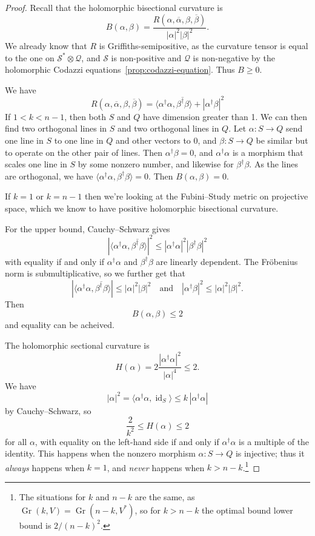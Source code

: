 \documentclass[11pt]{article}
\newtheorem*{proof}{Proof}
\newcommand{\cc}[1]{\mathcal{#1}}
\def\qandq{\quad\text{and}\quad}
\def\ov#1{\overline{#1}}
\DeclareMathOperator{\Gr}{Gr}
\DeclareMathOperator{\id}{id}
\begin{document}
\begin{proof}
Recall that the holomorphic bisectional curvature is
\[
B(\alpha,\beta)
= \frac{R(\alpha,\ov\alpha,\beta,\ov\beta)}{|\alpha|^2|\beta|^2}.
\]
We already know that $R$ is Griffiths-semipositive, as the curvature tensor is equal to the one on $\cc S^* \otimes \cc Q$, and $\cc S$ is non-positive and $\cc Q$ is non-negative by the holomorphic Codazzi equations~\ref{prop:codazzi-equation}. Thus $B \geq 0$.

We have
\[
R(\alpha,\ov\alpha,\beta,\ov\beta)
= \langle \alpha^\dagger \alpha, \ov{\beta^\dagger \beta} \rangle
+ |\alpha^\dagger \beta|^2
\]
If $1 < k < n-1$, then both $S$ and $Q$ have dimension greater than 1.
We can then find two orthogonal lines in $S$ and two orthogonal lines
in $Q$. Let $\alpha : S \to Q$ send one line in $S$ to one line in $Q$
and other vectors to 0, and $\beta : S \to Q$ be similar but to
operate on the other pair of lines.
Then $\alpha^\dagger \beta = 0$, and $\alpha^\dagger \alpha$ is a morphism that scales one line in $S$ by some nonzero number, and likewise for $\beta^\dagger \beta$. As the lines are orthogonal, we have $\langle \alpha^\dagger \alpha, \beta^\dagger \beta \rangle = 0$. Then $B(\alpha,\beta) = 0$.

If $k = 1$ or $k = n-1$ then we're looking at the Fubini--Study metric on projective space, which we know to have positive holomorphic bisectional curvature.

For the upper bound,
Cauchy--Schwarz gives
\[
|\langle \alpha^\dagger \alpha, \ov{\beta^\dagger \beta} \rangle|^2
\leq
|\alpha^\dagger \alpha|^2 |\beta^\dagger \beta|^2
\]
with equality if and only if $\alpha^\dagger\alpha$ and $\beta^\dagger\beta$ are linearly dependent.
The Fr\"obenius norm is submultiplicative, so we further get that
\[
|\langle \alpha^\dagger \alpha, \ov{\beta^\dagger \beta} \rangle|
\leq |\alpha|^2 |\beta|^2
\qandq
|\alpha^\dagger \beta|^2
\leq |\alpha|^2 |\beta|^2.
\]
Then
\[
B(\alpha,\beta) \leq 2
\]
and equality can be acheived.

The holomorphic sectional curvature is
\[
H(\alpha) = 2 \frac{|\alpha^\dagger \alpha|^2}{|\alpha|^4} \leq 2.
\]
We have
\[
|\alpha|^2
= \langle \alpha^\dagger \alpha, \id_S \rangle
\leq k \, |\alpha^\dagger \alpha|
\]
by Cauchy--Schwarz, so
\[
\frac{2}{k^2} \leq H(\alpha) \leq 2
\]
for all $\alpha$, with equality on the left-hand side if and only if
$\alpha^\dagger \alpha$ is a multiple of the identity. This happens
when the nonzero morphism $\alpha : S \to Q$ is injective; thus it \emph{always} happens when $k = 1$, and \emph{never} happens when $k > n-k$.\footnote{The situations for $k$ and $n-k$ are the same, as $\Gr(k,V) = \Gr(n-k,V^*)$, so for $k > n-k$ the optimal bound lower bound is $2/(n-k)^2$.}



\end{proof}
\end{document}
